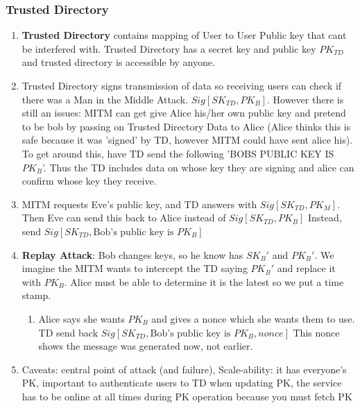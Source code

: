 \documentclass{article}
\begin{document}
\subsubsection{Trusted Directory}
\begin{enumerate}
\item \textbf{Trusted Directory} contains mapping of User to User Public key that cant be interfered with. Trusted Directory has a secret key and public key $PK_{TD}$ and trusted directory is accessible by anyone. 
\item Trusted Directory signs transmission of data so receiving users can check if there was a Man in the Middle Attack. $Sig[SK_{TD}, PK_B]$. However there is still an issues: MITM can get give Alice his/her own public key and pretend to be bob by passing on Trusted Directory Data to Alice (Alice thinks this is safe because it was 'signed' by TD, however MITM could have sent alice his). To get around this, have TD send the following 'BOBS PUBLIC KEY IS $PK_B$'. Thus the TD includes data on whose key they are signing and alice can confirm whose key they receive.
\item MITM requests Eve's public key, and TD answers with $Sig[SK_{TD}, PK_M]$. Then Eve can send this back to Alice instead of $Sig[SK_{TD}, PK_B]$ Instead, send $Sig[SK_{TD}, \textrm{Bob's public key is } PK_B]$
\item \textbf{Replay Attack}: Bob changes keys, so he know has $SK_B'$ and $PK_B'$. We imagine the MITM wants to intercept the TD saying $PK_B'$ and replace it with $PK_B$. Alice must be able to determine it is the latest so we put a time stamp. 
\begin{enumerate}
\item Alice says she wants $PK_B$ and gives a nonce which she wants them to use. TD send back $Sig[SK_{TD}, \textrm{Bob's public key is } PK_B, nonce]$ This nonce shows the message was generated now, not earlier.
\end{enumerate} 
\item Caveats: central point of attack (and failure), Scale-ability: it has everyone's PK, important to authenticate users to TD when updating PK, the service has to be online at all times during PK operation because you must fetch PK
\end{enumerate}
\end{document}
